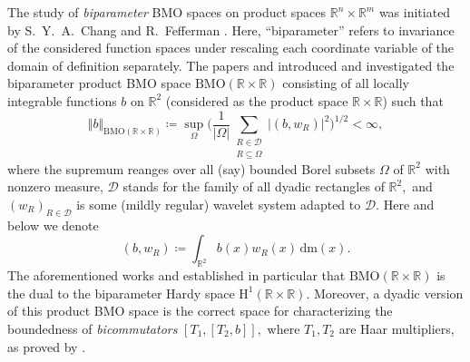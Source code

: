 \documentclass{article}
\theoremstyle{definition}
\theoremstyle{remark}
\numberwithin{equation}{section}
\newcommand{\mathdm}{\,\mathrm{dm}}
\newcommand{\bfD}{\bm{\mathcal{D}}}
\newcommand{\reals}{\mathbb{R}}
\newcommand{\1}{\mathbf{1}}
\begin{document}
    The study of \emph{biparameter} BMO spaces on product spaces $\reals^n\times\reals^m$ was initiated by S.~Y.~A.~Chang \cite{Chang_1979} and R.~Fefferman \cite{RFefferman_1979}. Here, ``biparameter'' refers to invariance of the considered function spaces under rescaling each coordinate variable of the domain of definition separately. The papers \cite{Chang_1979} and \cite{RFefferman_1979} introduced and investigated the biparameter product BMO space $\text{BMO}(\reals\times\reals)$ consisting of all locally integrable functions $b$ on $\reals^2$ (considered as the product space $\reals\times\reals$) such that
    \begin{equation*}
        \Vert b\Vert_{\text{BMO}(\reals\times\reals)}\coloneq \sup_{\Omega}\bigg(\frac{1}{|\Omega|}\sum_{\substack{R\in\bfD\\ R\subseteq\Omega}}\left|(b,w_{R})\right|^2\bigg)^{1/2}<\infty,
    \end{equation*}
    where the supremum reanges over all (say) bounded Borel subsets $\Omega$ of $\reals^2$ with nonzero measure, $\bfD$ stands for the family of all dyadic rectangles of $\reals^2,$
    and $(w_{R})_{R\in\bfD}$ is some (mildly regular) wavelet system adapted to $\bfD.$ Here and below we denote
    \begin{equation*}
        (b,w_{R})\coloneq \int_{\reals^2}b(x)w_{R}(x)\mathdm(x).
    \end{equation*}
    The aforementioned works \cite{Chang_1979} and \cite{RFefferman_1979} established in particular that $\text{BMO}(\reals\times\reals)$ is the dual to the biparameter Hardy space $\mathrm{H}^1(\reals\times\reals).$ Moreover, a dyadic version of this product BMO space is the correct space for characterizing the boundedness of \emph{bicommutators} $[T_1,[T_2,b]],$ where $T_1,T_2$ are Haar multipliers, as proved by \cite{Blasco_Pott_2005}.
\end{document}
